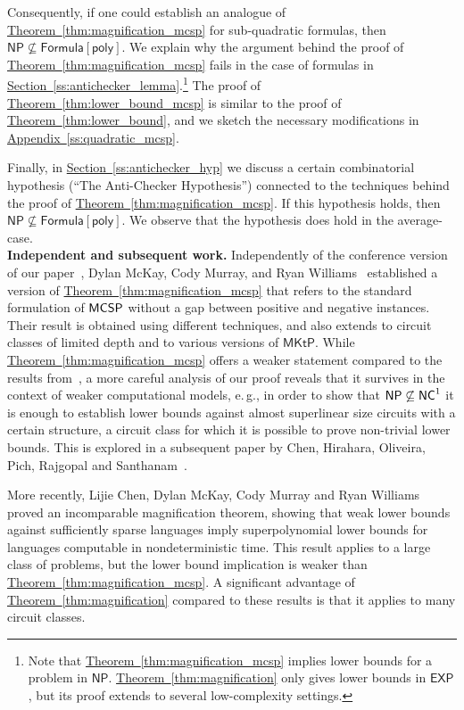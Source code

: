 \documentclass[11pt]{article}
\numberwithin{equation}{section}
\theoremstyle{definition}
\theoremstyle{plain}
\newcommand{\eg}{e.\,g.}
\newcommand{\expref}[2]{\hyperref[#2]{#1~\ref{#2}}}
\newcommand{\NC}{\ensuremath{{\sf NC}^1}\xspace}
\newcommand{\NP}{\ensuremath{{\sf NP}}\xspace}
\newcommand{\MCSP}{\ensuremath{{\sf MCSP}}\xspace}
\begin{document}
Consequently, if one could establish an analogue of \expref{Theorem}{thm:magnification_mcsp} for sub-quadratic formulas, then $\mathsf{NP} \nsubseteq \mathsf{Formula}[\mathsf{poly}]$. We explain why the argument behind the proof of \expref{Theorem}{thm:magnification_mcsp} fails in the case of formulas in \expref{Section}{ss:antichecker_lemma}.\footnote{Note that \expref{Theorem}{thm:magnification_mcsp} implies lower bounds for a problem in $\mathsf{NP}$.  \expref{Theorem}{thm:magnification} only gives lower bounds in $\mathsf{EXP}$, but its proof extends to several low-complexity settings.} The proof of \expref{Theorem}{thm:lower_bound_mcsp} is similar to the proof of \expref{Theorem}{thm:lower_bound}, and we sketch the necessary modifications in \expref{Appendix}{ss:quadratic_mcsp}.


Finally, in \expref{Section}{ss:antichecker_hyp} we discuss a certain combinatorial hypothesis (``The Anti-Checker Hypothesis'') connected to the techniques behind the proof of \expref{Theorem}{thm:magnification_mcsp}. If this hypothesis holds, then $\mathsf{NP} \nsubseteq \mathsf{Formula}[\mathsf{poly}]$. We observe that the hypothesis does hold in the average-case.\\

%
\noindent \textbf{Independent and subsequent work.}  %
%
%
%
Independently of the conference version of our paper~\cite{conf-version},
%
Dylan McKay, Cody Murray, and Ryan Williams~\cite{STOC_paper} established a version of \expref{Theorem}{thm:magnification_mcsp} that refers to the standard formulation of \MCSP without a gap between positive and negative instances. Their result is obtained using  different techniques, and also extends to circuit classes of limited depth and to various versions of $\mathsf{MKtP}$. While \expref{Theorem}{thm:magnification_mcsp} offers a weaker statement compared to the results from~\cite{STOC_paper}, a more careful analysis of our proof reveals that it survives in the context of weaker computational models, \eg, in order to show that $\NP\not\subseteq\NC$ it is enough to establish lower bounds against almost superlinear size circuits with a certain structure, a circuit class for which it is possible to prove non-trivial lower bounds. This is explored in a subsequent
%
paper by %
Chen, Hirahara, Oliveira, Pich, Rajgopal and Santhanam~\cite{chen_et_al:LIPIcs:2020:11755}.

More recently, Lijie Chen, Dylan McKay, Cody Murray and Ryan Williams~\cite{CCC_paper} proved an incomparable magnification theorem, showing that weak lower bounds against sufficiently sparse languages imply superpolynomial lower bounds for languages computable in nondeterministic time. This result applies to a large class of problems, but the lower bound implication is weaker than \expref{Theorem}{thm:magnification_mcsp}. A significant advantage of \expref{Theorem}{thm:magnification} compared to these results is that it applies to many circuit classes.
\end{document}
